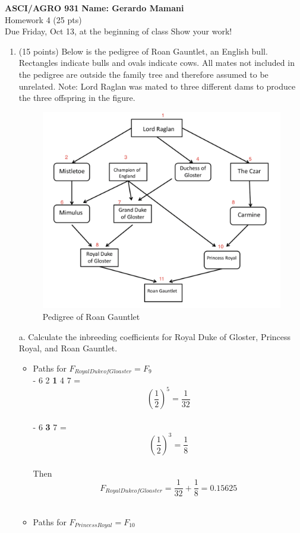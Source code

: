 \documentclass[a4paper, 11pt]{article}
\begin{document}
\noindent
\large\textbf{ASCI/AGRO 931} \hfill \textbf{Name: Gerardo Mamani} \\
\normalsize Homework 4 (25 pts) \hfill  \\
Due Friday, Oct 13, at the beginning of class \hfill 
Show your work! \hfill

\begin{enumerate}

\item (15 points) Below is the pedigree of Roan Gauntlet, an English bull. Rectangles indicate bulls and ovals indicate cows. All mates not included in the pedigree are outside the family tree and therefore assumed to be unrelated. Note: Lord Raglan was mated to three different dams to produce the three offspring in the figure. \\

\begin{figure}[h]
    \centering
    \includegraphics[height=0.5\textwidth]{Homework4_pedigree.png}
    \caption{Pedigree of Roan Gauntlet}
\end{figure}

\subitem a. Calculate the inbreeding coefficients for Royal Duke of Gloster, Princess Royal, and Roan Gauntlet.

\begin{itemize}
\item Paths for $F_{Royal Duke of Gloaster} = F_{9}$\\

- 6 2 \textbf{1} 4 7 = \[(\frac{1}{2})^5 = \frac{1}{32}\] \\
- 6 \textbf{3} 7 = \[(\frac{1}{2})^3 = \frac{1}{8}\]\\
Then \[F_{Royal Duke of Gloaster} = \frac{1}{32} + \frac{1}{8} = 0.15625 \] \\

\item Paths for $F_{Princess Royal} = F_{10}$\\


\end{itemize}
\end{enumerate}
\end{document}

